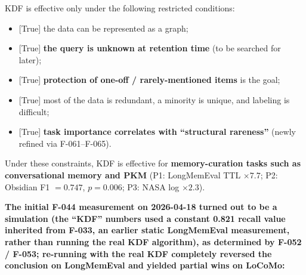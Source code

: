 KDF is effective only under the following restricted conditions:

\begin{itemize}
\tightlist
\item
  {[}True{]} the data can be represented as a graph;
\item
  {[}True{]} \textbf{the query is unknown at retention time} (to be searched for later);
\item
  {[}True{]} \textbf{protection of one-off / rarely-mentioned items} is the goal;
\item
  {[}True{]} most of the data is redundant, a minority is unique, and labeling is difficult;
\item
  {[}True{]} \textbf{task importance correlates with ``structural rareness''} (newly refined via F-061--F-065).
\end{itemize}

Under these constraints, KDF is effective for \textbf{memory-curation tasks such as conversational memory and PKM} (P1: LongMemEval TTL \(\times 7.7\); P2: Obsidian F1 \(= 0.747\), \(p = 0.006\); P3: NASA log \(\times 2.3\)).

\textbf{The initial F-044 measurement on 2026-04-18 turned out to be a simulation (the ``KDF'' numbers used a constant 0.821 recall value inherited from F-033, an earlier static LongMemEval measurement, rather than running the real KDF algorithm), as determined by F-052 / F-053; re-running with the real KDF completely reversed the conclusion on LongMemEval and yielded partial wins on LoCoMo:}

